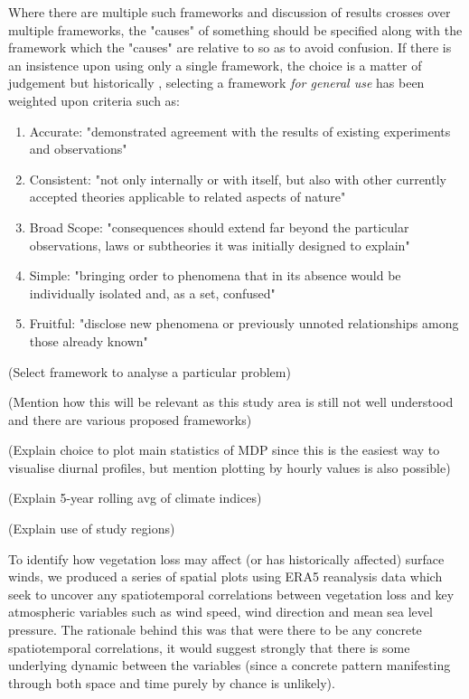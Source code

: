 Where there are multiple such frameworks and discussion of results crosses over multiple frameworks, the "causes" of something should be specified along with the framework which the "causes" are relative to so as to avoid confusion. If there is an insistence upon using only a single framework, the choice is a matter of judgement but historically \citep{kuhn1970}, selecting a framework \textit{for general use} has been weighted upon criteria such as: 
\begin{enumerate}
	\item Accurate: "demonstrated agreement with the results of existing experiments and observations" \citep{kuhn1977}
	\item Consistent: "not only internally or with itself, but also with other currently accepted theories applicable to related aspects of nature" \citep{kuhn1977}
	\item Broad Scope: "consequences should extend far beyond the particular observations, laws or subtheories it was initially designed to explain" \citep{kuhn1977}
	\item Simple: "bringing order to phenomena that in its absence would be individually isolated and, as a set, confused" \citep{kuhn1977}
	\item Fruitful: "disclose new phenomena or previously unnoted relationships among those already known" \citep{kuhn1977}
\end{enumerate}



(Select framework to analyse a particular problem)

(Mention how this will be relevant as this study area is still not well understood and there are various proposed frameworks)

(Explain choice to plot main statistics of MDP since this is the easiest way to visualise diurnal profiles, but mention plotting by hourly values is also possible)

(Explain 5-year rolling avg of climate indices)

(Explain use of study regions)

To identify how vegetation loss may affect (or has historically affected) surface winds, we produced a series of spatial plots using ERA5 reanalysis data which seek to uncover any spatiotemporal correlations between vegetation loss and key atmospheric variables such as wind speed, wind direction and mean sea level pressure. The rationale behind this was that were there to be any concrete spatiotemporal correlations,
it would suggest strongly that there is some underlying dynamic between the variables (since a concrete pattern manifesting through both space and time purely by chance is unlikely).

